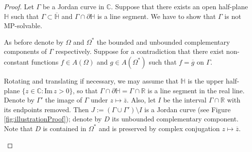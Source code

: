 \documentclass{amsart}
\theoremstyle{plain}
\theoremstyle{definition}
\theoremstyle{remark}
\newcommand{\mC}{\mathbb{C}}
\newcommand{\mR}{\mathbb{R}}
\renewcommand{\Im}{\mathrm{Im\,}}
\begin{document}
\begin{proof}
Let $\Gamma$ be a Jordan curve in $\mC$. Suppose that there exists an open half-plane $\mathbb{H}$ such that $\Gamma \subset \overline{\mathbb{H}}$ and $\Gamma \cap \partial \mathbb{H}$ is a line segment. We have to show that $\Gamma$ is not MP-solvable.

As before denote by $\Omega$ and $\Omega^*$ the bounded and unbounded complementary components of $\Gamma$ respectively. Suppose for a contradiction that there exist non-constant functions $f \in A(\Omega)$ and $g \in A(\Omega^*)$ such that $f=\overline{g}$ on $\Gamma$.

Rotating and translating if necessary, we may assume that $\mathbb{H}$ is the upper half-plane $\{z \in \mC: \Im{z}>0\}$, so that $\Gamma \cap \partial \mathbb{H} = \Gamma \cap \mR$ is a line segment in the real line. Denote by $\Gamma'$ the image of $\Gamma$ under $z \mapsto \overline{z}$. Also, let $I$ be the interval $\Gamma \cap \mR$ with its endpoints removed. Then $J:=(\Gamma \cup \Gamma') \setminus I$ is a Jordan curve (see Figure \ref{fig:illustrationProof}); denote by $D$ its unbounded complementary component. Note that $D$ is contained in $\Omega^*$ and is preserved by complex conjugation $z \mapsto \overline{z}$.
\begin{figure}[ht]
    \centering
\end{figure}
\end{proof}
\end{document}
